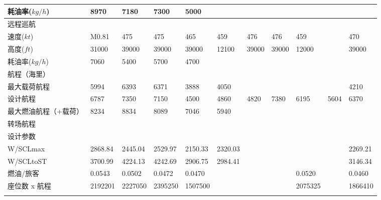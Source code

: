 \documentclass[12pt,a4paper]{report}
\begin{document}
\begin{landscape}
\begin{center}
\begin{longtable}{|p{1.5cm}|p{1.3cm}|p{1.1cm}|p{1.1cm}|p{1.1cm}|p{1.1cm}|p{1.1cm}|p{1.1cm}|p{1.1cm}|p{1.1cm}|p{1.1cm}|}
耗油率($kg/h$)	&	8970	&	7180	&	7300	&	5000	&		&		&		&		&		&	\\ \hline
远程巡航	&		&		&		&		&		&		&		&		&		&	\\ \hline
速度($kt$)	&	M0.81	&	475	&	475	&	465	&	459	&	476	&	476	&	459	&		&	470\\ \hline
高度($ft$)	&	31000	&	39000	&	39000	&	39000	&	12100	&	39000	&	39000	&	12000	&		&	39000\\ \hline
耗油率($kg/h$)	&	7060	&	5400	&	5700	&	4700	&		&		&		&		&		&	\\ \hline
航程（海里）	&		&		&		&		&		&		&		&		&		&	\\ \hline
最大载荷航程	&	5994	&	6393	&	6371	&	3888	&	4050	&		&		&		&		&	4210\\ \hline
设计航程	&	6787	&	7350	&	7150	&	4500	&	4860	&	4820	&	7380	&	6195	&	5604	&	6370\\ \hline
最大燃油航程（+载荷）	&	8234	&	8834	&	8089	&	7046	&	5940	&		&		&		&		&	\\ \hline
转场航程 	&		&		&		&		&		&		&		&		&		&	\\ \hline
设计参数	&		&		&		&		&		&		&		&		&		&	\\ \hline
W/SCLmax	&	2868.84	&	2445.04	&	2529.97	&	2150.33	&	2320.03	&		&		&		&		&	2269.21\\ \hline
W/SCLtoST	&	3700.99	&	4224.13	&	4242.69	&	2906.75	&	2984.41	&		&		&		&		&	3146.34\\ \hline
燃油/旅客	&	0.0543	&	0.0502	&	0.0472	&	0.0470	&		&		&		&	0.0520	&		&	0.0460\\ \hline
座位数 x 航程	&	2192201	&	2227050	&	2395250	&	1507500	&		&		&		&	2075325	&		&	1866410\\ \hline
\hline
\label{nosegearpars} 
\end{longtable}
\end{center}
\end{landscape}
\end{document}
